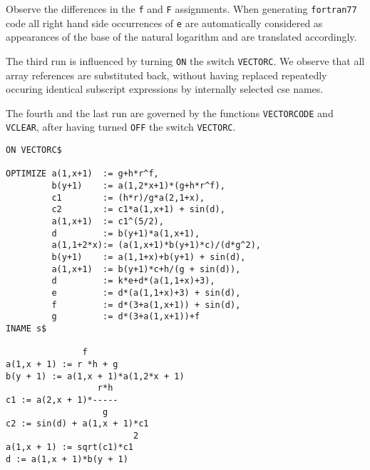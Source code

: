 Observe the differences in the {\tt f} and {\tt F} assignments. When generating
{\tt fortran77} code all right hand side occurrences of {\tt e} are 
automatically considered as appearances of the base of the natural logarithm
and are translated accordingly.

The third run is influenced by turning {\tt ON} the switch {\tt VECTORC}.
We observe that all array references are substituted back, without having
replaced repeatedly occuring identical subscript expressions by internally 
selected cse names.

The fourth and the last run are governed by the functions {\tt VECTORCODE} and 
{\tt VCLEAR}, after having turned {\tt OFF} the switch {\tt VECTORC}.
{\small
\begin{verbatim}
ON VECTORC$

OPTIMIZE a(1,x+1)  := g+h*r^f,
         b(y+1)    := a(1,2*x+1)*(g+h*r^f),
         c1        := (h*r)/g*a(2,1+x),
         c2        := c1*a(1,x+1) + sin(d),
         a(1,x+1)  := c1^(5/2),
         d         := b(y+1)*a(1,x+1),
         a(1,1+2*x):= (a(1,x+1)*b(y+1)*c)/(d*g^2),
         b(y+1)    := a(1,1+x)+b(y+1) + sin(d),
         a(1,x+1)  := b(y+1)*c+h/(g + sin(d)),
         d         := k*e+d*(a(1,1+x)+3),
         e         := d*(a(1,1+x)+3) + sin(d),
         f         := d*(3+a(1,x+1)) + sin(d),
         g         := d*(3+a(1,x+1))+f
INAME s$

               f
a(1,x + 1) := r *h + g
b(y + 1) := a(1,x + 1)*a(1,2*x + 1)
                  r*h
c1 := a(2,x + 1)*-----
                   g
c2 := sin(d) + a(1,x + 1)*c1
                         2
a(1,x + 1) := sqrt(c1)*c1
d := a(1,x + 1)*b(y + 1)
\end{verbatim}}
\newpage
